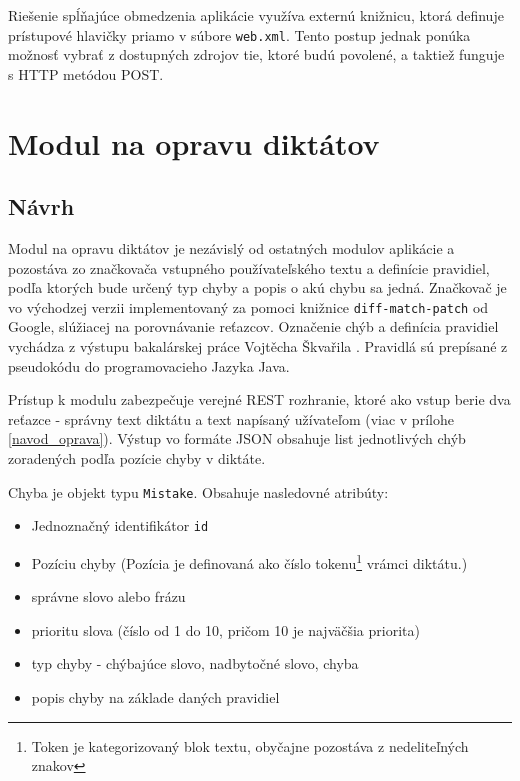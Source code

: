 \documentclass[12pt,oneside]{fithesis2}
\begin{document}
      		\par Riešenie spĺňajúce obmedzenia aplikácie využíva externú knižnicu\cite{dzhuvinov15}, ktorá definuje prístupové hlavičky priamo v súbore \texttt{web.xml}. Tento postup jednak ponúka možnosť vybrať z dostupných zdrojov tie, ktoré budú povolené, a taktiež funguje s HTTP metódou POST\cite{sof2}.
\pagebreak

      \section{Modul na opravu diktátov} \label{modul-diktaty}
      
      \subsection{Návrh}
      \par Modul na opravu diktátov je nezávislý od ostatných modulov aplikácie a pozostáva zo značkovača vstupného používateľského textu a definície pravidiel, podľa ktorých bude určený typ chyby a popis o akú chybu sa jedná. Značkovač je vo východzej verzii implementovaný za pomoci knižnice \texttt{diff-match-patch} od Google\cite{diffmatchpatch}, slúžiacej na porovnávanie reťazcov. Označenie chýb a definícia pravidiel vychádza z výstupu bakalárskej práce Vojtěcha Škvařila \cite{skvaril14}. Pravidlá sú prepísané z pseudokódu do programovacieho Jazyka Java.
      \par Prístup k modulu zabezpečuje verejné REST rozhranie, ktoré ako vstup berie dva reťazce - správny text diktátu a text napísaný užívateľom (viac v prílohe \ref{navod_oprava}). Výstup vo formáte JSON obsahuje list jednotlivých chýb zoradených podľa pozície chyby v diktáte.
      
	  \par Chyba je objekt typu \texttt{Mistake}. Obsahuje nasledovné atribúty: 
\begin{itemize}
	\item Jednoznačný identifikátor \texttt{id}
	\item Pozíciu chyby (Pozícia je definovaná ako číslo tokenu\footnote{Token je kategorizovaný blok textu, obyčajne pozostáva z nedeliteľných znakov} vrámci diktátu.)
	\item správne slovo alebo frázu
	\item prioritu slova (číslo od 1 do 10, pričom 10 je najväčšia priorita)
	\item typ chyby - chýbajúce slovo, nadbytočné slovo, chyba
	\item popis chyby na základe daných pravidiel
\end{itemize}
	
\end{document}
